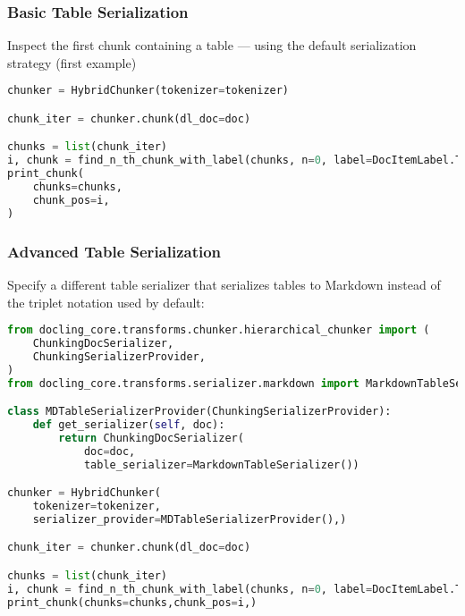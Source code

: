 \begin{frame}[fragile]\frametitle{Basic Table Serialization}
Inspect the first chunk containing a table — using the default serialization strategy (first example)

	  
\begin{lstlisting}[language=Python, basicstyle=\tiny]
chunker = HybridChunker(tokenizer=tokenizer)

chunk_iter = chunker.chunk(dl_doc=doc)

chunks = list(chunk_iter)
i, chunk = find_n_th_chunk_with_label(chunks, n=0, label=DocItemLabel.TABLE)
print_chunk(
    chunks=chunks,
    chunk_pos=i,
)

\end{lstlisting}		  
\end{frame}

\begin{frame}[fragile]\frametitle{Advanced Table Serialization}
Specify a different table serializer that serializes tables to Markdown instead of the triplet notation used by default:
	  
\begin{lstlisting}[language=Python, basicstyle=\tiny]
from docling_core.transforms.chunker.hierarchical_chunker import (
    ChunkingDocSerializer,
    ChunkingSerializerProvider,
)
from docling_core.transforms.serializer.markdown import MarkdownTableSerializer

class MDTableSerializerProvider(ChunkingSerializerProvider):
    def get_serializer(self, doc):
        return ChunkingDocSerializer(
            doc=doc,
            table_serializer=MarkdownTableSerializer())

chunker = HybridChunker(
    tokenizer=tokenizer,
    serializer_provider=MDTableSerializerProvider(),)

chunk_iter = chunker.chunk(dl_doc=doc)

chunks = list(chunk_iter)
i, chunk = find_n_th_chunk_with_label(chunks, n=0, label=DocItemLabel.TABL)
print_chunk(chunks=chunks,chunk_pos=i,)
\end{lstlisting}		  
\end{frame}

